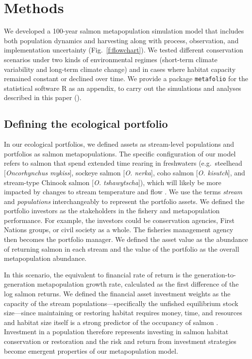 \section{Methods}

We developed a 100-year salmon metapopulation simulation model that includes both population dynamics and harvesting along with process, observation, and implementation uncertainty (Fig.~\ref{f:flowchart}). We tested different conservation scenarios under two kinds of environmental regimes (short-term climate variability and long-term climate change) and in cases where habitat capacity remained constant or declined over time. We provide a package \texttt{metafolio} \citep{metafoliopkg} for the statistical software \textsf{R} \citep{r2013} as an appendix, to carry out the simulations and analyses described in this paper (\somR).

\subsection{Defining the ecological portfolio}\label{defining-the-ecological-portfolio}

In our ecological portfolios, we defined assets as stream-level populations and portfolios as salmon metapopulations. The specific configuration of our model refers to salmon that spend extended time rearing in freshwaters (e.g.~steelhead {[}\emph{Oncorhynchus mykiss}{]}, sockeye salmon {[}\emph{O. nerka}{]}, coho salmon {[}\emph{O. kisutch}{]}, and stream-type Chinook salmon {[}\emph{O. tshawytscha}{]}), which will likely be more impacted by changes to stream temperature and flow \citep{mantua2010}. We use the terms \emph{stream} and \emph{populations} interchangeably to represent the portfolio assets. We defined the portfolio investors as the stakeholders in the fishery and metapopulation performance. For example, the investors could be conservation agencies, First Nations groups, or civil society as a whole. The fisheries management agency then becomes the portfolio manager. We defined the asset value as the abundance of returning salmon in each stream and the value of the portfolio as the overall metapopulation abundance.

In this scenario, the equivalent to financial rate of return is the generation-to-generation metapopulation growth rate, calculated as the first difference of the log salmon returns. We defined the financial asset investment weights as the capacity of the stream populations---specifically the unfished equilibrium stock size---since maintaining or restoring habitat requires money, time, and resources and habitat size itself is a strong predictor of the occupancy of salmon \citep{isaak2007}. Investment in a population therefore represents investing in salmon habitat conservation or restoration and the risk and return from investment strategies become emergent properties of our metapopulation model.

